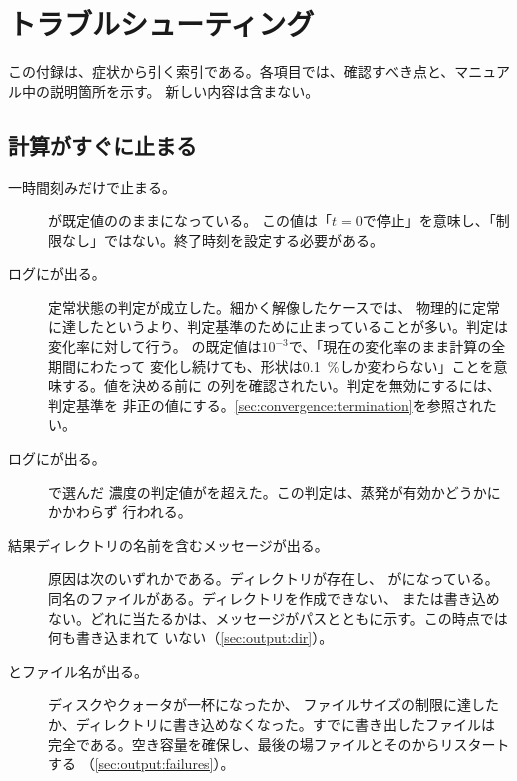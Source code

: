 \chapter{トラブルシューティング}
\label{ch:troubleshooting}

この付録は、症状から引く索引である。各項目では、確認すべき点と、マニュアル中の説明箇所を示す。
新しい内容は含まない。

\section{計算がすぐに止まる}
\label{sec:trouble:stops}

\begin{description}
  \item[一時間刻みだけで止まる。] が既定値ののままになっている。
    この値は「$t = 0$で停止」を意味し、「制限なし」ではない。終了時刻を設定する必要がある。

  \item[ログにが出る。] 定常状態の判定が成立した。細かく解像したケースでは、
    物理的に定常に達したというより、判定基準のために止まっていることが多い。判定は変化率に対して行う。
    の既定値は$10^{-3}$で、「現在の変化率のまま計算の全期間にわたって
    変化し続けても、形状は\SI{0.1}{\percent}しか変わらない」ことを意味する。値を決める前に
    の列を確認されたい。判定を無効にするには、判定基準を
    非正の値にする。\cref{sec:convergence:termination}を参照されたい。

  \item[ログにが出る。] で選んだ
    濃度の判定値がを超えた。この判定は、蒸発が有効かどうかにかかわらず
    行われる。

  \item[結果ディレクトリの名前を含むメッセージが出る。] 原因は次のいずれかである。ディレクトリが存在し、
    がになっている。同名のファイルがある。ディレクトリを作成できない、
    または書き込めない。どれに当たるかは、メッセージがパスとともに示す。この時点では何も書き込まれて
    いない（\cref{sec:output:dir}）。

  \item[とファイル名が出る。] ディスクやクォータが一杯になったか、
    ファイルサイズの制限に達したか、ディレクトリに書き込めなくなった。すでに書き出したファイルは
    完全である。空き容量を確保し、最後の場ファイルとそのからリスタートする
    （\cref{sec:output:failures}）。


\end{description}
